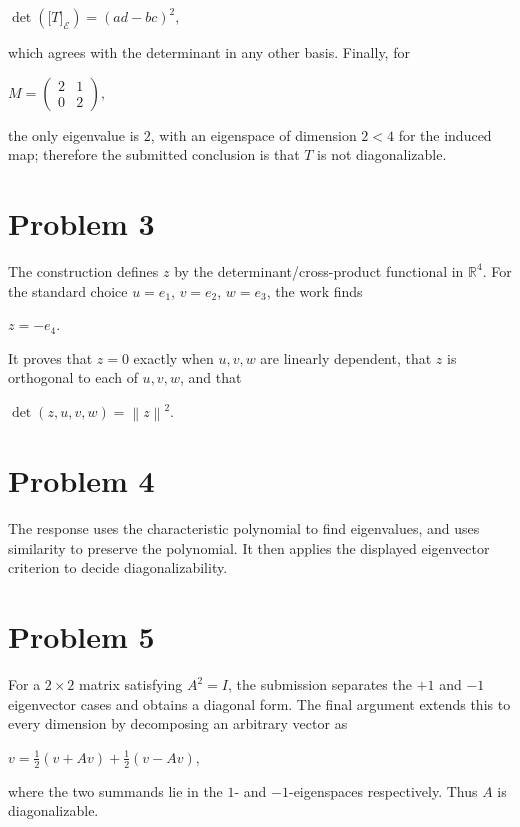\(\det\left( \lbrack T\rbrack_{\mathcal{E}} \right) = \left( {ad - bc} \right)^{2},\)

which agrees with the determinant in any other basis. Finally, for

\(M = \begin{pmatrix}
2 & 1 \\
0 & 2
\end{pmatrix},\)

the only eigenvalue is \(2\), with an eigenspace of dimension \(2 < 4\) for the induced map; therefore the submitted conclusion is that \(T\) is not diagonalizable.

\section{Problem 3}

The construction defines \(z\) by the determinant/cross-product functional in \(\mathbb{R}^{4}\). For the standard choice \(u = e_{1}\), \(v = e_{2}\), \(w = e_{3}\), the work finds

\(z = - e_{4}.\)

It proves that \(z = 0\) exactly when \(u,v,w\) are linearly dependent, that \(z\) is orthogonal to each of \(u,v,w\), and that

\(\det\left( {z,u,v,w} \right) = \left\| z \right\|^{2}.\)

\section{Problem 4}

The response uses the characteristic polynomial to find eigenvalues, and uses similarity to preserve the polynomial. It then applies the displayed eigenvector criterion to decide diagonalizability.

\section{Problem 5}

For a \(2 \times 2\) matrix satisfying \(A^{2} = I\), the submission separates the \(+ 1\) and \(- 1\) eigenvector cases and obtains a diagonal form. The final argument extends this to every dimension by decomposing an arbitrary vector as

\(v = \frac{1}{2}\left( {v + Av} \right) + \frac{1}{2}\left( {v - Av} \right),\)

where the two summands lie in the \(1\)- and \(- 1\)-eigenspaces respectively. Thus \(A\) is diagonalizable.
